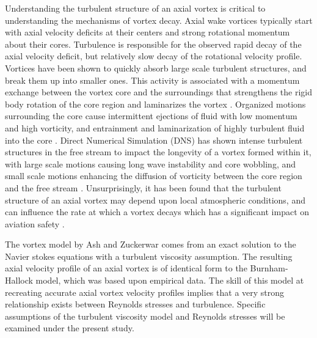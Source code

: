 Understanding the turbulent structure of an axial vortex is critical to 
understanding the mechanisms of vortex decay. Axial wake vortices typically 
start with axial velocity deficits at their centers and strong rotational 
momentum about their cores. Turbulence is responsible for the observed rapid 
decay of the axial velocity deficit, but relatively slow decay of the 
rotational velocity profile. Vortices have been shown to quickly absorb large 
scale turbulent structures, and break them up into smaller ones. This activity 
is associated with a momentum exchange between the vortex core and the 
surroundings that strengthens the rigid body rotation of the core region and 
laminarizes the vortex \cite{ragab1994,beninati2005}. Organized motions 
surrounding the core 
cause intermittent ejections of fluid with low momentum and high vorticity, and 
entrainment and laminarization of highly turbulent fluid into the core 
\cite{bandyopadhyay1991}. Direct Numerical Simulation (DNS) has shown 
intense turbulent structures in the free stream to impact the longevity of a 
vortex formed within it, with large scale motions causing long wave instability 
and core wobbling, and small scale motions enhancing the diffusion of vorticity 
between the core region and the free stream \cite{risso1997}. Unsurprisingly, 
it has been found that the turbulent structure of an axial vortex may depend 
upon local atmospheric conditions, and can influence the rate at which a vortex 
decays which has a significant impact on aviation safety \cite{ash1998}.

The vortex model by Ash and Zuckerwar comes from an exact solution to the 
Navier stokes equations with a turbulent viscosity assumption. The resulting 
axial velocity profile of an axial vortex is of identical form to the 
Burnham-Hallock model, which was based upon empirical data. The skill of this 
model at recreating accurate axial vortex velocity profiles implies that a very 
strong relationship exists between Reynolds stresses and turbulence. Specific 
assumptions of the turbulent viscosity model and Reynolds stresses will be 
examined under the present study.
